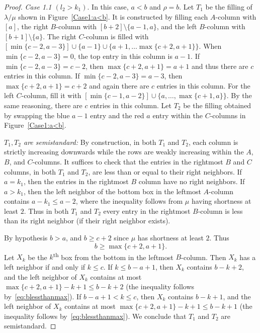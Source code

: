 \documentclass[10pt]{article}
\theoremstyle{definition}
\let\hypertargeta\hypertarget %
\newenvironment{Case}[1]{\par\vskip2pt\noindent%
\emph{#1}.}{\vskip2pt}
\begin{document}
\begin{proof}
\begin{Case}
{\hypertargeta{theo3.13_case1.1}{Case 1.1} $(l_2 > k_1)$} In this case, $a<b$ and $\rho = b$. Let $T_1$ be the filling of $\lambda/\mu$ shown in Figure~\ref{Case1:a<b}. It is constructed by filling each $A$-column with $[a]$, the right $B$-column with $[b+2]\setminus \{a-1,a\}$, and the left $B$-column with $[b+1]\setminus \{a\}$. The right $C$-column is filled with $[\min\{c-2,a-3\}] \cup \{a-1\} \cup \{a+1,\ldots \max\{c+2,a+1\}\}$. When $\min\{c-2,a-3\}= 0$, the top entry in this column is $a-1$. If $\min\{c-2,a-3\} = c-2$, then $\max\{c+2,a+1\} = a+1$ and thus there are $c$ entries in this column. If $\min\{c-2,a-3\} = a-3$, then $\max\{c+2,a+1\} = c+2$ and again there are $c$ entries in this column. For the left $C$-column, fill it with $[\min\{c-1,a-2\}]\cup \{a,\ldots, \max\{c+1,a\}\}$. By the same reasoning, there are $c$ entries in this column. Let $T_2$ be the filling obtained by swapping the blue $a-1$ entry and the red $a$ entry within the $C$-columns in Figure~\ref{Case1:a<b}. 

\emph{$T_1, T_2$ are semistandard:} By construction, in both $T_1$ and $T_2$, each column is strictly increasing downwards while the rows are weakly increasing within the $A$, $B$, and $C$-columns. It suffices to check that the entries in the rightmost $B$ and $C$ columns, in both $T_1$ and $T_2$, are less than or equal to their right neighbors. If $a=k_1$, then the entries in the rightmost $B$ column have no right neighbors. If $a > k_1$, then the left neighbor of the bottom box in the leftmost $A$-column contains $a - k_1 \leq a - 2$, where the inequality follows from $\mu$ having shortness at least $2$. Thus in both $T_1$ and $T_2$ every entry in the rightmost $B$-column is less than its right neighbor (if their right neighbor exists). 

By hypothesis $b>a$, and $b \geq c+2$ since $\mu$ has shortness at least $2$. Thus 
\begin{equation}
\label{eq:blessthanmax}
b \geq \max\{c+2,a+1\}.
\end{equation}
Let $X_k$ be the $k$\textsuperscript{th} box from the bottom in the leftmost $B$-column. Then $X_k$ has a left neighbor if and only if $k \leq c$. If $k \leq b-a + 1$, then $X_k$ contains $b-k+2$, and the left neighbor of $X_k$ contains at most $\max\{c+2,a+1\}-k+1 \leq b-k+2$ (the inequality follows by~\eqref{eq:blessthanmax}). If $b-a+1 < k \leq c$, then $X_k$ contains $b-k+1$, and the left neighbor of $X_k$ contains at most $\max\{c+2,a+1\}-k+1 \leq b-k+1$ (the inequality follows by~\eqref{eq:blessthanmax}). We conclude that $T_1$ and $T_2$ are semistandard.




\end{Case}
\end{proof}
\end{document}
